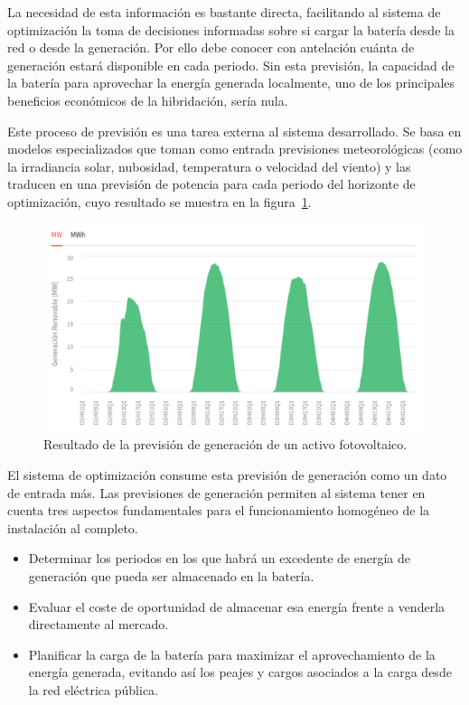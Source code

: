 La necesidad de esta información es bastante directa, facilitando al sistema de optimización la toma de decisiones informadas sobre si cargar la batería desde la red o desde la generación. Por ello debe conocer con antelación cuánta de generación estará disponible en cada periodo. Sin esta previsión, la capacidad de la batería para aprovechar la energía generada localmente, uno de los principales beneficios económicos de la hibridación, sería nula.

Este proceso de previsión es una tarea externa al sistema desarrollado. Se basa en modelos especializados que toman como entrada previsiones meteorológicas (como la irradiancia solar, nubosidad, temperatura o velocidad del viento) y las traducen en una previsión de potencia para cada periodo del horizonte de optimización, cuyo resultado se muestra en la figura~\ref{fig:prevision-generacion}.

\begin{figure}
  \centering
  \includegraphics[width=0.75\linewidth]{figures/prevision-generacion.png}
  \caption[Previsión de generación de un activo.]{Resultado de la previsión de generación de un activo fotovoltaico.}
  \label{fig:prevision-generacion}
\end{figure}

El sistema de optimización consume esta previsión de generación como un dato de entrada más. Las previsiones de generación permiten al sistema tener en cuenta tres aspectos fundamentales para el funcionamiento homogéneo de la instalación al completo.

\begin{itemize}

  \item Determinar los periodos en los que habrá un excedente de energía de generación que pueda ser almacenado en la batería.

  \item Evaluar el coste de oportunidad de almacenar esa energía frente a venderla directamente al mercado.

  \item Planificar la carga de la batería para maximizar el aprovechamiento de la energía generada, evitando así los peajes y cargos asociados a la carga desde la red eléctrica pública.

\end{itemize}


